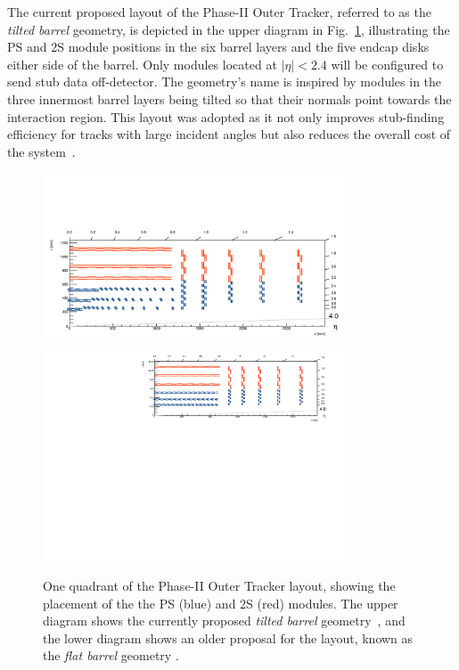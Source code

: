 The current proposed layout of the Phase-II Outer Tracker, referred to as the \emph{tilted barrel} geometry, is depicted in the upper diagram in Fig.~\ref{fig:trackerlayout}, illustrating the PS and 2S module positions in the six barrel layers and the five endcap disks either side of the barrel.
Only modules located at $|\eta| < 2.4$ will be configured to send stub data off-detector.
The geometry's name is inspired by modules in the three innermost barrel layers being tilted so that their normals point towards the interaction region.
This layout was adopted as it not only improves stub-finding efficiency for tracks with large incident angles but also reduces the overall cost of the system~\cite{P2TrackerTDR}.

\begin{figure}[tbp]
\centering
\includegraphics[width=0.8\textwidth,trim={1.1truecm 0truecm 1truecm 12truecm},clip]{figs/tk-upgrade/tiltedbarrelmap.pdf}
\includegraphics[width=0.8\textwidth,trim={0.7truecm 0truecm 1truecm 0truecm},clip]{figs/tk-upgrade/mersilayout.pdf}
\caption{One quadrant of the Phase-II Outer Tracker layout, showing the placement of the the PS (blue) and 2S (red) modules. The upper diagram shows the currently proposed \emph{tilted barrel} geometry~\cite{tiltedGeometry, P2TrackerTDR}, and the lower diagram shows an older proposal for the layout, known as the \emph{flat barrel} geometry \cite{CMS_Upgrade_TP}.}
\label{fig:trackerlayout}
\end{figure}

